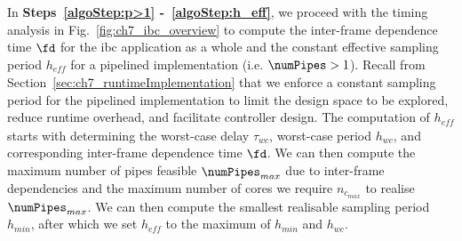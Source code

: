 In \textbf{Steps~\ref{algoStep:p>1} -~\ref{algoStep:h_eff}}, we proceed with the timing analysis in Fig.~\ref{fig:ch7_ibc_overview} to compute the inter-frame dependence time $\fd$ for the \gls{ibc} application as a whole and the constant effective sampling period $h_{\mathit{eff}}$ for a pipelined implementation (i.e. $\numPipes>1$).
Recall from Section~\ref{sec:ch7_runtimeImplementation} that we enforce a constant sampling period for the pipelined implementation to limit the design space to be explored, reduce runtime overhead, and facilitate controller design.
The computation of $h_{\mathit{eff}}$ starts with determining the worst-case delay $\tau_{wc}$, worst-case period $h_{wc}$, and corresponding inter-frame dependence time $\fd$. 
We can then compute the maximum number of pipes feasible $\numPipes_{max}$ due to inter-frame dependencies and the maximum number of cores we require $n_{c_{max}}$ to realise $\numPipes_{max}$. 
We can then compute the smallest realisable sampling period $h_{min}$, after which we set 
$h_{\mathit{eff}}$ to the maximum of $h_{min}$ and $h_{wc}$.

